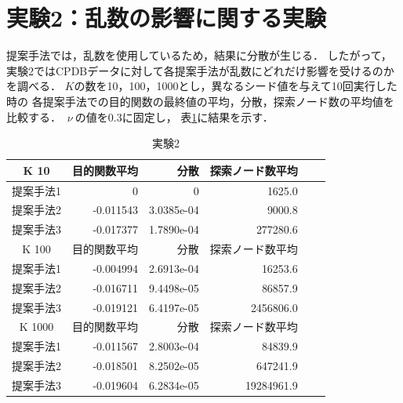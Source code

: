 \section{実験2：乱数の影響に関する実験}
提案手法では，乱数を使用しているため，結果に分散が生じる．
したがって，実験2ではCPDBデータに対して各提案手法が乱数にどれだけ影響を受けるのかを調べる．
$K$の数を10，100，1000とし，異なるシード値を与えて10回実行した時の
各提案手法での目的関数の最終値の平均，分散，探索ノード数の平均値を比較する．
$\ \nu\ $の値を0.3に固定し，
表\ref{randomseed}に結果を示す．
\begin{table}[t]
	\centering
	\begin{tabular}{|c|r|r|r|r|r|}
		\hline
		K 10 & 目的関数平均 & 分散 & 探索ノード数平均 \\
		\hline \hline
		提案手法1  & 0 & 0 & 1625.0 \\
		\hline
		提案手法2  & -0.011543 & 3.0385e-04 & 9000.8 \\
		\hline
		提案手法3  & -0.017377 & 1.7890e-04 & 277280.6 \\
		\hline
		\hline
		K 100 & 目的関数平均 & 分散 & 探索ノード数平均 \\
		\hline \hline
		提案手法1  & -0.004994 & 2.6913e-04 & 16253.6 \\
		\hline
		提案手法2  & -0.016711 & 9.4498e-05 & 86857.9 \\
		\hline
		提案手法3  & -0.019121 & 6.4197e-05 & 2456806.0 \\
		\hline
		\hline
		K 1000 & 目的関数平均 & 分散 & 探索ノード数平均 \\
		\hline \hline
		提案手法1  & -0.011567 & 2.8003e-04 & 84839.9 \\
		\hline
		提案手法2  & -0.018501 & 8.2502e-05 & 647241.9 \\
		\hline
		提案手法3  & -0.019604 & 6.2834e-05 & 19284961.9 \\
		\hline
	\end{tabular}
	\caption{実験2}
	\label{randomseed}
\end{table}


